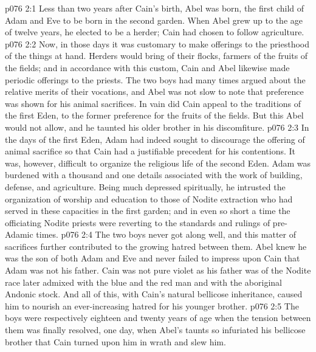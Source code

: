 \vs p076 2:1 Less than two years after Cain’s birth, Abel was born, the first child of Adam and Eve to be born in the second garden. When Abel grew up to the age of twelve years, he elected to be a herder; Cain had chosen to follow agriculture.
\vs p076 2:2 Now, in those days it was customary to make offerings to the priesthood of the things at hand. Herders would bring of their flocks, farmers of the fruits of the fields; and in accordance with this custom, Cain and Abel likewise made periodic offerings to the priests. The two boys had many times argued about the relative merits of their vocations, and Abel was not slow to note that preference was shown for his animal sacrifices. In vain did Cain appeal to the traditions of the first Eden, to the former preference for the fruits of the fields. But this Abel would not allow, and he taunted his older brother in his discomfiture.
\vs p076 2:3 In the days of the first Eden, Adam had indeed sought to discourage the offering of animal sacrifice so that Cain had a justifiable precedent for his contentions. It was, however, difficult to organize the religious life of the second Eden. Adam was burdened with a thousand and one details associated with the work of building, defense, and agriculture. Being much depressed spiritually, he intrusted the organization of worship and education to those of Nodite extraction who had served in these capacities in the first garden; and in even so short a time the officiating Nodite priests were reverting to the standards and rulings of pre\hyp{}Adamic times.
\vs p076 2:4 The two boys never got along well, and this matter of sacrifices further contributed to the growing hatred between them. Abel knew he was the son of both Adam and Eve and never failed to impress upon Cain that Adam was not his father. Cain was not pure violet as his father was of the Nodite race later admixed with the blue and the red man and with the aboriginal Andonic stock. And all of this, with Cain’s natural bellicose inheritance, caused him to nourish an ever\hyp{}increasing hatred for his younger brother.
\vs p076 2:5 The boys were respectively eighteen and twenty years of age when the tension between them was finally resolved, one day, when Abel’s taunts so infuriated his bellicose brother that Cain turned upon him in wrath and slew him.
